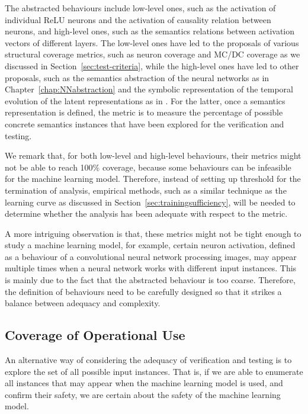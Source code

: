 The abstracted behaviours include low-level ones, such as the activation of individual ReLU neurons and the activation of causality relation between neurons, and high-level ones, such as the semantics relations between activation vectors of different layers. The low-level ones have led to the proposals of various structural coverage metrics, such as neuron coverage and MC/DC coverage as we discussed in Section~\ref{sec:test-criteria}, while the high-level ones have led to other proposals, such as the semantics abstraction of the neural networks as in Chapter~\ref{chap:NNabstraction} and the symbolic representation of the temporal evolution of the latent representations as in \cite{9451178}. For the latter, once a semantics representation is defined, the metric is to measure the percentage of possible concrete semantics instances that have been explored for the verification and testing. 

We remark that, for both low-level and high-level behaviours, their metrics might not be able to reach 100\% coverage, because some behaviours can be infeasible for the machine learning model. Therefore, instead of setting up threshold for the termination of analysis, empirical methods, such as a similar technique as the learning curve as discussed in Section~\ref{sec:trainingsufficiency}, will be needed to determine whether the analysis has been adequate with respect to the  metric. 

A more intriguing observation is that, these metrics might not be tight enough to study a machine learning model, for example, certain neuron activation, defined as a behaviour of a convolutional neural network processing images, may appear multiple times when a neural network works with different input instances. This is mainly due to the fact that the abstracted behaviour is too coarse.  Therefore, the definition of behaviours need to be carefully designed so that it strikes a balance between adequacy and complexity.  

\subsection*{Coverage of Operational Use} 

An alternative way of considering the adequacy of verification and testing is to explore the set of all possible input instances. That is, if we are able to enumerate all instances that may appear when the machine learning model is used, and confirm their safety, we are certain about the safety of the machine learning model.  

